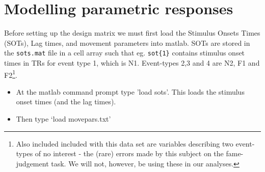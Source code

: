 \documentclass[a4paper,titlepage]{book}
\newcommand{\bi}{\begin{itemize}}
\newcommand{\ei}{\end{itemize}}
\begin{document}
\section{Modelling parametric responses}

Before setting up the design matrix we must first 
load the Stimulus Onsets Times (SOTs), Lag times, and movement
parameters into matlab. SOTs are stored in the 
\verb!sots.mat! file in a 
cell array such that eg. \verb!sot{1}! contains 
stimulus onset times in TRs for event type 1, which is N1. Event-types 2,3 and 4 are N2, F1 and F2\footnote{Also included included with this data set are variables describing two event-types of no interest - the (rare) errors made by this subject on the fame-judgement task. 
We will not, however, be using these in our analyses.}.

\bi
\item{At the matlab command prompt type 'load sots'. This loads the stimulus onset times (and the lag times).}
\item{Then type `load movepars.txt'}
\ei
\end{document}
